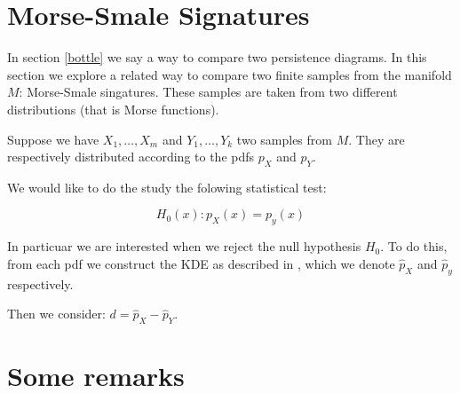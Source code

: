 \section{Morse-Smale Signatures}

In section \ref{bottle} we say a way to compare two persistence diagrams. In this section we explore a related way to compare
two finite samples from the manifold $M$:
Morse-Smale singatures.
These samples are taken from two different distributions (that is Morse functions).

Suppose we have $X_1,\ldots,X_m$ and $Y_1,\ldots,Y_k$ two samples from $M$.  
They are respectively distributed according to the pdfs $p_X$ and $p_Y$.

We would like to do the study the folowing statistical test:

$$
H_0(x):p_X(x)=p_y(x)
$$

In particuar we are interested when we reject the null hypothesis $H_0$.
To do this, from each pdf we construct the KDE as described in \label{kde},
which we denote $\hat p_X$ and $\hat p_y$ respectively.



Then we consider: $d=\hat p_X - \hat p_Y$.

\section{Some remarks}
